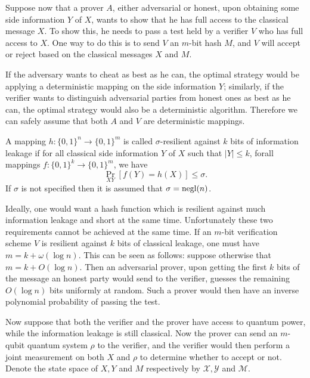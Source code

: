Suppose now that a prover $A$, either adversarial or honest, upon obtaining some side information $Y$ of $X$, wants to show that he has full access to the classical message $X$. To show this, he needs to pass a test held by a verifier $V$ who has full access to $X$. One way to do this is to send $V$ an $m$-bit hash $M$, and $V$ will accept or reject based on the classical messages $X$ and $M$.

If the adversary wants to cheat as best as he can, the optimal strategy would be applying a deterministic mapping on the side information $Y$; similarly, if the verifier wants to distinguish adversarial parties from honest ones as best as he can, the optimal strategy would also be a deterministic algorithm. Therefore we can safely assume that both $A$ and $V$ are deterministic mappings.

\begin{definition}
    A mapping $h:\{0,1\}^n\rightarrow\{0,1\}^m$ is called $\sigma$-resilient against $k$ bits of information leakage if for all classical side information $Y$ of $X$ such that $|Y|\leq k$, forall mappings $f:\{0,1\}^k\rightarrow \{0,1\}^m$, we have
        $$\Pr_{XY}[f(Y)=h(X)]\leq \sigma.$$
        If $\sigma$ is not specified then it is assumed that $\sigma=\text{negl}(n)$.
\end{definition}

Ideally, one would want a hash function which is resilient against much information leakage and short at the same time.
Unfortunately these two requirements cannot be achieved at the same time. If an $m$-bit verification scheme $V$ is resilient against $k$ bits of classical leakage, one must have $m=k+\omega(\log n)$. This can be seen as follows: suppose otherwise that $m=k+O(\log n)$. Then an
adversarial prover, upon getting the first $k$ bits of the message an honest party would send to the verifier, guesses the remaining $O(\log n)$ bits uniformly at random. Such a prover would then have an inverse polynomial probability of passing the test.

Now suppose that both the verifier and the prover have access to quantum power, while the information leakage is still classical. Now the prover can send an $m$-qubit quantum system $\rho$ to the verifier, and the verifier would then perform a joint measurement on both $X$ and $\rho$ to determine whether to accept or not. Denote the state space of $X,Y$ and $M$ respectively by $\mathcal{X},\mathcal{Y}$ and $\mathcal{M}$.


